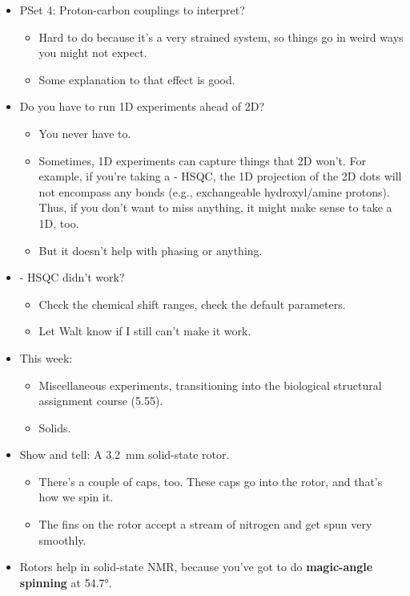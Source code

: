\documentclass[../notes.tex]{subfiles}
\begin{document}
\begin{itemize}
    \item PSet 4: Proton-carbon couplings to interpret?
    \begin{itemize}
        \item Hard to do because it's a very strained system, so things go in weird ways you might not expect.
        \item Some explanation to that effect is good.
    \end{itemize}
    \item Do you have to run 1D experiments ahead of 2D?
    \begin{itemize}
        \item You never have to.
        \item Sometimes, 1D experiments can capture things that 2D won't. For example, if you're taking a - HSQC, the 1D projection of the 2D dots will not encompass any  bonds (e.g., exchangeable hydroxyl/amine protons). Thus, if you don't want to miss anything, it might make sense to take a 1D, too.
        \item But it doesn't help with phasing or anything.
    \end{itemize}
    \item {}- HSQC didn't work?
    \begin{itemize}
        \item Check the chemical shift ranges, check the default parameters.
        \item Let Walt know if I still can't make it work.
    \end{itemize}
    \item This week:
    \begin{itemize}
        \item Miscellaneous experiments, transitioning into the biological structural assignment course (5.55).
        \item Solids.
    \end{itemize}
    \item Show and tell: A \SI{3.2}{\milli\meter} solid-state rotor.
    \begin{itemize}
        \item There's a couple of caps, too. These caps go into the rotor, and that's how we spin it.
        \item The fins on the rotor accept a stream of nitrogen and get spun very smoothly.
    \end{itemize}
    \item Rotors help in solid-state NMR, because you've got to do \textbf{magic-angle spinning} at \ang{54.7}.

\end{itemize}
\end{document}
